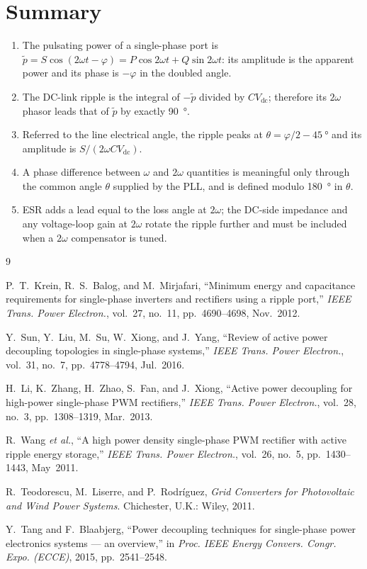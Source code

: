 \documentclass[11pt,a4paper]{article}
\begin{document}
\section{Summary}

\begin{enumerate}
  \item The pulsating power of a single-phase port is
        $\tilde p = S\cos(2\omega t - \varphi)
                  = P\cos 2\omega t + Q \sin 2\omega t$: its amplitude is the
        apparent power and its phase is $-\varphi$ in the doubled angle.
  \item The DC-link ripple is the integral of $-\tilde p$ divided by
        $C V_{\mathrm{dc}}$; therefore its $2\omega$ phasor leads that of
        $\tilde p$ by exactly \SI{90}{\degree}.
  \item Referred to the line electrical angle, the ripple peaks at
        $\theta = \varphi/2 - \SI{45}{\degree}$ and its amplitude is
        $S/(2\omega C V_{\mathrm{dc}})$.
  \item A phase difference between $\omega$ and $2\omega$ quantities is
        meaningful only through the common angle $\theta$ supplied by the PLL,
        and is defined modulo \SI{180}{\degree} in $\theta$.
  \item ESR adds a lead equal to the loss angle at $2\omega$; the DC-side
        impedance and any voltage-loop gain at $2\omega$ rotate the ripple
        further and must be included when a $2\omega$ compensator is tuned.
\end{enumerate}

\begin{thebibliography}{9}

P.~T.~Krein, R.~S.~Balog, and M.~Mirjafari,
``Minimum energy and capacitance requirements for single-phase inverters and
rectifiers using a ripple port,''
\emph{IEEE Trans. Power Electron.}, vol.~27, no.~11, pp.~4690--4698, Nov.~2012.

Y.~Sun, Y.~Liu, M.~Su, W.~Xiong, and J.~Yang,
``Review of active power decoupling topologies in single-phase systems,''
\emph{IEEE Trans. Power Electron.}, vol.~31, no.~7, pp.~4778--4794, Jul.~2016.

H.~Li, K.~Zhang, H.~Zhao, S.~Fan, and J.~Xiong,
``Active power decoupling for high-power single-phase PWM rectifiers,''
\emph{IEEE Trans. Power Electron.}, vol.~28, no.~3, pp.~1308--1319, Mar.~2013.

R.~Wang \emph{et al.},
``A high power density single-phase PWM rectifier with active ripple energy
storage,''
\emph{IEEE Trans. Power Electron.}, vol.~26, no.~5, pp.~1430--1443, May~2011.

R.~Teodorescu, M.~Liserre, and P.~Rodr\'{i}guez,
\emph{Grid Converters for Photovoltaic and Wind Power Systems}.
Chichester, U.K.: Wiley, 2011.

Y.~Tang and F.~Blaabjerg,
``Power decoupling techniques for single-phase power electronics systems --- an
overview,''
in \emph{Proc. IEEE Energy Convers. Congr. Expo. (ECCE)}, 2015, pp.~2541--2548.

\end{thebibliography}
\end{document}
